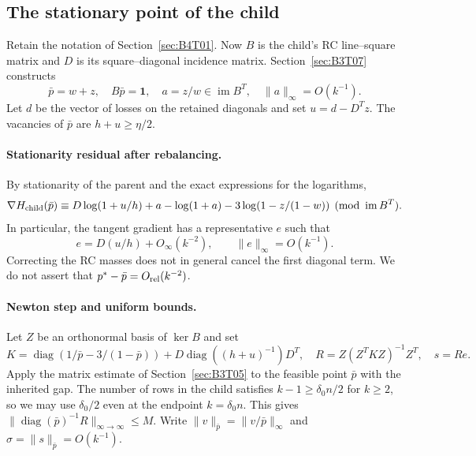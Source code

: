 \subsection{The stationary point of the child}\label{sec:B4T02}
Retain the notation of Section~\ref{sec:B4T01}. Now $B$ is the child's RC line--square matrix and $D$ is its
square--diagonal incidence matrix. Section~\ref{sec:B3T07} constructs
\[
 \bar p=w+z,\quad B\bar p=\mathbf1,\quad
 a=z/w\in\operatorname{im}B^T,\quad \|a\|_\infty=O(k^{-1}).
\]
Let $d$ be the vector of losses on the retained diagonals and set $u=d-D^Tz$.
The vacancies of $\bar p$ are $h+u\ge\eta/2$.

\paragraph{Stationarity residual after rebalancing.}
By stationarity of the parent and the exact expressions for the logarithms,
\[
 \nabla H_{\rm child}(\bar p)\equiv
 D\log(1+u/h)+a-\log(1+a)-3\log(1-z/(1-w))
 \pmod{\operatorname{im}B^T}.
\]
In particular, the tangent gradient has a representative $e$ such that
\[
 e=D(u/h)+O_\infty(k^{-2}),\qquad \|e\|_\infty=O(k^{-1}).
\]
Correcting the RC masses does not in general cancel the first diagonal term. We do not assert that $p^*-\bar
p=O_{\rm rel}(k^{-2})$.

\paragraph{Newton step and uniform bounds.}
Let $Z$ be an orthonormal basis of $\ker B$ and set
\[
 K=\operatorname{diag}(1/\bar p-3/(1-\bar p))
       +D\operatorname{diag}((h+u)^{-1})D^T,\quad
 R=Z(Z^TKZ)^{-1}Z^T,\quad s=Re.
\]
Apply the matrix estimate of Section~\ref{sec:B3T05} to the feasible point $\bar p$ with the inherited gap.
The number of rows in the child satisfies $k-1\ge\delta_0 n/2$ for $k\ge2$, so we may use $\delta_0/2$ even
at the endpoint $k=\delta_0n$. This gives $\|\operatorname{diag}(\bar p)^{-1}R\|_{\infty\to\infty}\le M$.
Write $\|v\|_{\bar p}=\|v/\bar p\|_\infty$ and $\sigma=\|s\|_{\bar p}=O(k^{-1})$.

